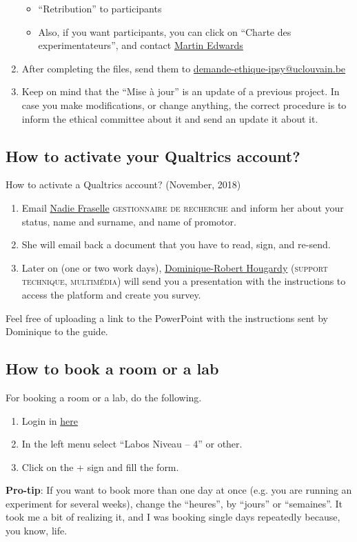 \documentclass{article}
\begin{document}
\begin{enumerate}
\begin{itemize}
        \item ``Retribution'' to participants
        \item Also, if you want participants, you can click on ``Charte des experimentateurs'', and contact \href{mailto:martin.edwards@uclouvain.be}{Martin Edwards}
    \end{itemize}
    \item After completing the files, send them to \href{mailto:demande-ethique-ipsy@uclouvain.be}{demande-ethique-ipsy@uclouvain.be}  
    \item Keep on mind that the ``Mise à jour'' is an update of a previous project. In case you make modifications, or change anything, the correct procedure is to inform the ethical committee about it and send an update it about it. 
\end{enumerate}


\subsection{How to activate your Qualtrics account?}
\label{subsec: Qualtrics}
How to activate a Qualtrics account? (November, 2018)
\begin{enumerate}
    \item Email \href{mailto:Nadine.fraselle@uclouvain.be}{Nadie Fraselle} \textsc{gestionnaire de recherche} and inform her about your status, name and surname, and name of promotor. 
    \item She will email back a document that you have to read, sign, and re-send.
    \item Later on (one or two work days), \href{mailto:Dominique-Robert.Hougardy@uclouvain.be}{Dominique-Robert Hougardy} \textsc{(support technique, multimédia)} will send you a presentation with the instructions to access the platform and create you survey. 
\end{enumerate}
Feel free of uploading a link to the PowerPoint with the instructions sent by Dominique to the guide.


\subsection{How to book a room or a lab}
\label{subsec: book}
For booking a room or a lab, do the following. 
\begin{enumerate}
    \item Login in \href{https://sites.uclouvain.be/reservation-psp/login.php}{here} 
    \item In the left menu select ``Labos Niveau – 4'' or other. 
    \item Click on the + sign and fill the form. 
\end{enumerate}
\textbf{Pro-tip}: If you want to book more than one day at once (e.g. you are running an experiment for several weeks), change the ``heures'', by ``jours'' or ``semaines''. It took me a bit of realizing it, and I was booking single days repeatedly because, you know, life.
\end{document}
